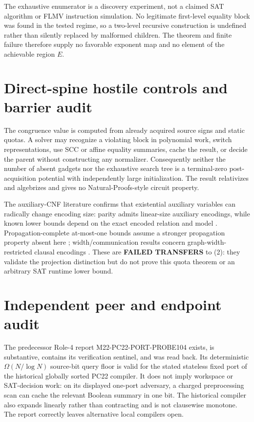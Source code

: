 \documentclass[11pt]{article}
\begin{document}
The exhaustive enumerator is a discovery experiment, not a claimed SAT
algorithm or FLMV instruction simulation.  No legitimate first-level equality
block was found in the tested regime, so a two-level recursive construction is
undefined rather than silently replaced by malformed children.  The theorem
and finite failure therefore supply no favorable exponent map and no element
of the achievable region $E$.

\section{Direct-spine hostile controls and barrier audit}
The congruence value is computed from already acquired source signs and static
quotas.  A solver may recognize a violating block in polynomial work, switch
representations, use SCC or affine equality summaries, cache the result, or
decide the parent without constructing any normalizer.  Consequently neither
the number of absent gadgets nor the exhaustive search tree is a terminal-zero
post-acquisition potential with independently large initialization.  The
result relativizes and algebrizes and gives no Natural-Proofs-style circuit
property.

The auxiliary-CNF literature confirms that existential auxiliary variables
can radically change encoding size: parity admits linear-size auxiliary
encodings, while known lower bounds depend on the exact encoded relation and
model \cite{parity}.  Propagation-complete at-most-one bounds assume a stronger
propagation property absent here \cite{amo}; width/communication results concern
graph-width-restricted clausal encodings \cite{width}.  These are
\textbf{FAILED TRANSFERS} to (2): they validate the projection distinction but
do not prove this quota theorem or an arbitrary SAT runtime lower bound.

\section{Independent peer and endpoint audit}
The predecessor Role-4 report M22-PC22-PORT-PROBE104 exists, is substantive,
contains its verification sentinel, and was read back.  Its deterministic
$\Omega(N/\log N)$ source-bit query floor is valid for the stated stateless
fixed port of the historical globally sorted PC22 compiler.  It does not imply
workspace or SAT-decision work: on its displayed one-port adversary, a charged
preprocessing scan can cache the relevant Boolean summary in one bit.  The
historical compiler also expands linearly rather than contracting and is not
clausewise monotone.  The report correctly leaves alternative local compilers
open.
\end{document}
